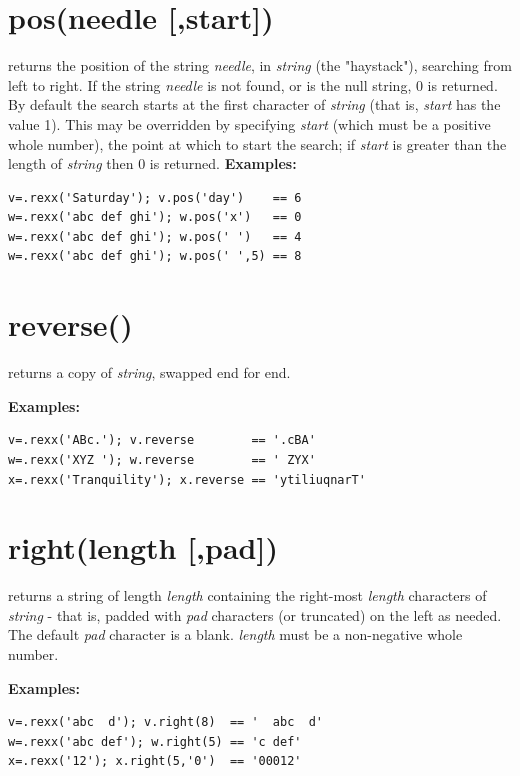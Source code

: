 \section{pos(needle [,start{]})}\label{refpos}
returns the position of the string \emph{needle}, in
\emph{string} (the "haystack"), searching from left to right.
If the string \emph{needle} is not found, or is the null string,
0 is returned.
By default the search starts at the first character of
\emph{string} (that is, \emph{start} has the value 1).
This may be overridden by specifying \emph{start} (which must be a
positive whole number), the point at which to start the search; if
\emph{start} is greater than the length of \emph{string} then 0
is returned.
 \textbf{Examples:}
\begin{lstlisting}
v=.rexx('Saturday'); v.pos('day')    == 6
w=.rexx('abc def ghi'); w.pos('x')   == 0
w=.rexx('abc def ghi'); w.pos(' ')   == 4
w=.rexx('abc def ghi'); w.pos(' ',5) == 8
\end{lstlisting}

\section{reverse()}\label{refreverse}
returns a copy of \emph{string}, swapped end for end.
 
\textbf{Examples:}
\begin{lstlisting}
v=.rexx('ABc.'); v.reverse        == '.cBA'
w=.rexx('XYZ '); w.reverse        == ' ZYX'
x=.rexx('Tranquility'); x.reverse == 'ytiliuqnarT'
\end{lstlisting}

\section{right(length [,pad{]})}\label{refright}

returns a string of length \emph{length} containing the
right-most \emph{length} characters of \emph{string} -
that is, padded with \emph{pad} characters (or truncated) on the
left as needed.  The default \emph{pad} character is a blank.
\emph{length} must be a non-negative whole number.
 
\textbf{Examples:}
\begin{lstlisting}
v=.rexx('abc  d'); v.right(8)  == '  abc  d'
w=.rexx('abc def'); w.right(5) == 'c def'
x=.rexx('12'); x.right(5,'0')  == '00012'
\end{lstlisting}

